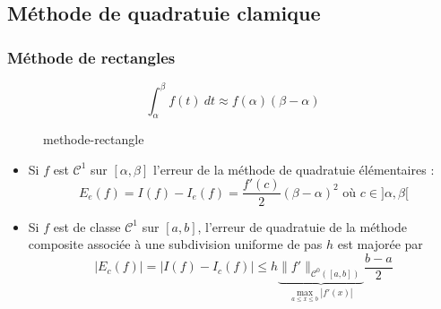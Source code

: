 \subsection{Méthode de quadratuie clamique}
\subsubsection*{Méthode de rectangles}
\begin{definition}
    \[
    \int_{{\alpha}}^{{\beta}} {f(t)} \: d{t} \approx f(\alpha)(\beta - \alpha)
    \] 
\begin{figure}[H]
    \centering
    \caption{methode-rectangle}
    \label{fig:methode-rectangle}
\end{figure}
\end{definition}
\begin{prop}
    \begin{itemize}
        \item 
            Si $f$ est  $\mathcal{C}^{1}$ sur  $[\alpha, \beta]$ l'erreur de la méthode de quadratuie élémentaires :
            \[
                E_e(f) = I(f) - I_e(f) = \frac{f'(c)}{2}(\beta - \alpha )^2 \text{ où } c \in ]\alpha, \beta[
            \] 
        \item Si $f$ est de classe  $\mathcal{C}^1$ sur  $[a, b]$, l'erreur de quadratuie de la méthode composite associée à une subdivision uniforme de pas  $h$ est majorée par 
             \[
                 \left| E_c(f) \right| = \left| I(f) - I_c(f) \right| \le h \underbrace{\|f'\|_{\mathcal{C}^0([a, b])}}_{\max_{a \le x \le b}|f'(x)|} \frac{b - a}{2}
            \] 
    \end{itemize}
\end{prop}

